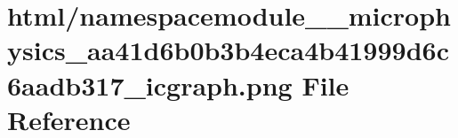 \hypertarget{namespacemodule____microphysics__aa41d6b0b3b4eca4b41999d6c6aadb317__icgraph_8png}{}\section{html/namespacemodule\+\_\+\+\_\+microphysics\+\_\+aa41d6b0b3b4eca4b41999d6c6aadb317\+\_\+icgraph.png File Reference}
\label{namespacemodule____microphysics__aa41d6b0b3b4eca4b41999d6c6aadb317__icgraph_8png}
